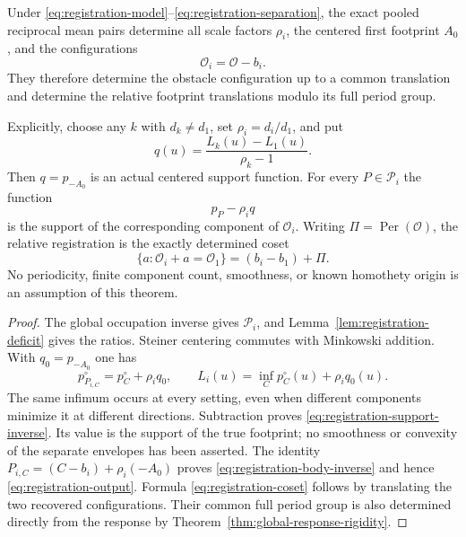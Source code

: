 \begin{theorem}
\label{thm:registration-rigidity}
Under \eqref{eq:registration-model}--\eqref{eq:registration-separation},
the exact pooled reciprocal mean pairs determine all scale factors
$\rho_i$, the centered first footprint $A_0$, and the configurations
\begin{equation}\label{eq:registration-output}
                       \mathcal O_i=\mathcal O-b_i.
\end{equation}
They therefore determine the obstacle configuration up to a common
translation and determine the relative footprint translations modulo
its full period group.

Explicitly, choose any $k$ with $d_k\ne d_1$, set
$\rho_i=d_i/d_1$, and put
\begin{equation}\label{eq:registration-support-inverse}
 q(u)=\frac{L_k(u)-L_1(u)}{\rho_k-1}.
\end{equation}
Then $q=p_{-A_0}$ is an actual centered support function. For every
$P\in\mathcal P_i$ the function
\begin{equation}\label{eq:registration-body-inverse}
                         p_P-\rho_iq
\end{equation}
is the support of the corresponding component of $\mathcal O_i$.
Writing $\Pi=\operatorname{Per}(\mathcal O)$, the relative registration
is the exactly determined coset
\begin{equation}\label{eq:registration-coset}
 \{a:\mathcal O_i+a=\mathcal O_1\}=(b_i-b_1)+\Pi.
\end{equation}
No periodicity, finite component count, smoothness, or known homothety
origin is an assumption of this theorem.
\end{theorem}
\begin{proof}
The global occupation inverse gives $\mathcal P_i$, and
Lemma~\ref{lem:registration-deficit} gives the ratios. Steiner centering
commutes with Minkowski addition. With $q_0=p_{-A_0}$ one has
\[
 p_{P_{i,C}}^\circ=p_C^\circ+\rho_iq_0,
 \qquad
 L_i(u)=\inf_Cp_C^\circ(u)+\rho_iq_0(u).
\]
The same infimum occurs at every setting, even when different
components minimize it at different directions. Subtraction proves
\eqref{eq:registration-support-inverse}. Its value is the support of
the true footprint; no smoothness or convexity of the separate
envelopes has been asserted. The identity
$P_{i,C}=(C-b_i)+\rho_i(-A_0)$ proves
\eqref{eq:registration-body-inverse} and hence
\eqref{eq:registration-output}. Formula
\eqref{eq:registration-coset} follows by translating the two recovered
configurations. Their common full period group is also determined
directly from the response by Theorem~\ref{thm:global-response-rigidity}.
\end{proof}

